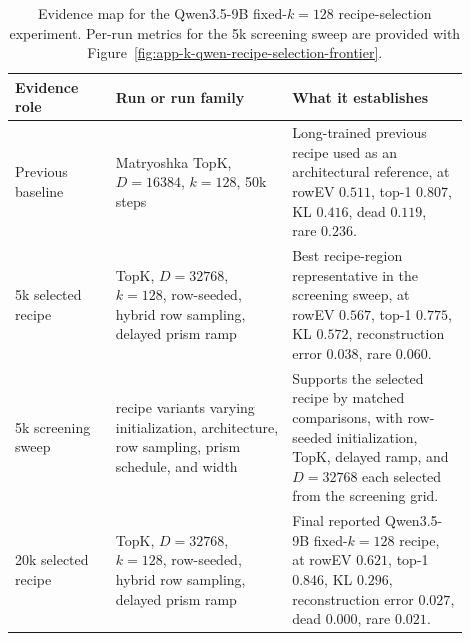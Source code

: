 \begin{table}[!tbp]
\caption{Evidence map for the Qwen3.5-9B fixed-$k=128$ recipe-selection
experiment. Per-run metrics for the 5k screening sweep are provided with
Figure~\ref{fig:app-k-qwen-recipe-selection-frontier}.}
\label{tab:app-k-qwen-recipe-ledger}
\centering
\footnotesize
\setlength{\tabcolsep}{6pt}
\renewcommand{\arraystretch}{1.12}
\begin{tabular}{@{}>{\RaggedRight\arraybackslash}p{0.20\linewidth}>{\RaggedRight\arraybackslash}p{0.35\linewidth}>{\RaggedRight\arraybackslash}p{0.35\linewidth}@{}}
\toprule
Evidence role & Run or run family & What it establishes \\
\midrule
Previous baseline
& Matryoshka TopK, $D=16384$, $k=128$, 50k steps
& Long-trained previous recipe used as an architectural reference, at rowEV
$0.511$, top-1 $0.807$, KL $0.416$, dead $0.119$, rare $0.236$. \\
\addlinespace
5k selected recipe
& TopK, $D=32768$, $k=128$, row-seeded, hybrid row sampling, delayed prism ramp
& Best recipe-region representative in the screening sweep, at rowEV $0.567$,
top-1 $0.775$, KL $0.572$, reconstruction error $0.038$, rare $0.060$. \\
\addlinespace
5k screening sweep
& 18 recipe variants varying initialization, architecture, row sampling, prism
schedule, and width
& Supports the selected recipe by matched comparisons, with row-seeded
initialization, TopK, delayed ramp, and $D=32768$ each selected from the
screening grid. \\
\addlinespace
20k selected recipe
& TopK, $D=32768$, $k=128$, row-seeded, hybrid row sampling, delayed prism ramp
& Final reported Qwen3.5-9B fixed-$k=128$ recipe, at rowEV $0.621$, top-1 $0.846$,
KL $0.296$, reconstruction error $0.027$, dead $0.000$, rare $0.021$. \\
\bottomrule
\end{tabular}
\end{table}

